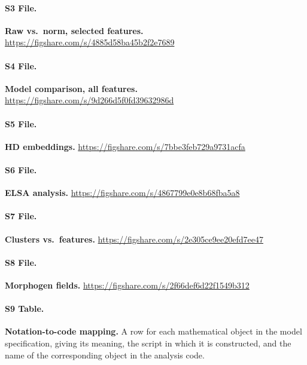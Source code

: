 \documentclass[10pt,letterpaper]{article}
\begin{document}
\paragraph*{S3 File.}
\label{S3_File}
\textbf{Raw vs.\ norm, selected features.} \url{https://figshare.com/s/4885d58ba45b2f2e7689}

\paragraph*{S4 File.}
\label{S4_File}
\textbf{Model comparison, all features.} \url{https://figshare.com/s/9d266d5f0fd39632986d}

\paragraph*{S5 File.}
\label{S5_File}
\textbf{HD embeddings.} \url{https://figshare.com/s/7bbe3feb729a9731acfa}

\paragraph*{S6 File.}
\label{S6_File}
\textbf{ELSA analysis.} \url{https://figshare.com/s/4867799e0e8b68fba5a8}

\paragraph*{S7 File.}
\label{S7_File}
\textbf{Clusters vs.\ features.} \url{https://figshare.com/s/2e305ce9ee20efd7ee47}

\paragraph*{S8 File.}
\label{S8_File}
\textbf{Morphogen fields.} \url{https://figshare.com/s/2f66def6d22f1549b312}

\paragraph*{S9 Table.}
\label{S9_Table}
\textbf{Notation-to-code mapping.} A row for each mathematical object in the model
specification, giving its meaning, the script in which it is constructed, and the name of
the corresponding object in the analysis code.
\end{document}
